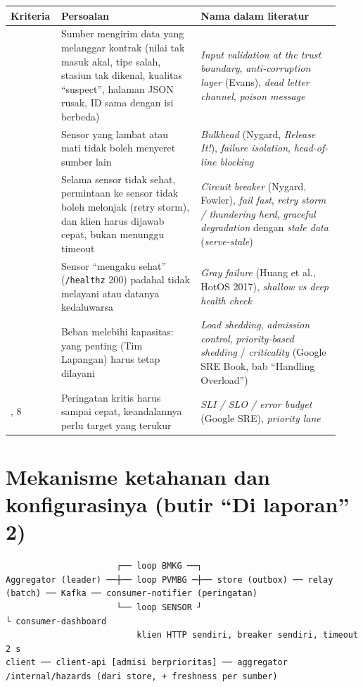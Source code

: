 {\small
\begin{longtable}{@{}>{\raggedright\arraybackslash}p{0.112\linewidth}>{\raggedright\arraybackslash}p{0.411\linewidth}>{\raggedright\arraybackslash}p{0.411\linewidth}@{}}
\toprule
\textbf{Kriteria} & \textbf{Persoalan} & \textbf{Nama dalam literatur} \\
\midrule
\endhead
2 & Sumber mengirim data yang melanggar kontrak (nilai tak masuk akal, tipe salah, stasiun tak dikenal, kualitas ``suspect'', halaman JSON rusak, ID sama dengan isi berbeda) & \emph{Input validation at the trust boundary}, \emph{anti-corruption layer} (Evans), \emph{dead letter channel}, \emph{poison message} \\
3 & Sensor yang lambat atau mati tidak boleh menyeret sumber lain & \emph{Bulkhead} (Nygard, \emph{Release It!}), \emph{failure isolation}, \emph{head-of-line blocking} \\
4 & Selama sensor tidak sehat, permintaan ke sensor tidak boleh melonjak (retry storm), dan klien harus dijawab cepat, bukan menunggu timeout & \emph{Circuit breaker} (Nygard, Fowler), \emph{fail fast}, \emph{retry storm / thundering herd}, \emph{graceful degradation} dengan \emph{stale data} (\emph{serve-stale}) \\
4 & Sensor ``mengaku sehat'' (\texttt{/\allowbreak{}healthz} 200) padahal tidak melayani atau datanya kedaluwarsa & \emph{Gray failure} (Huang et al., HotOS 2017), \emph{shallow vs deep health check} \\
5 & Beban melebihi kapasitas: yang penting (Tim Lapangan) harus tetap dilayani & \emph{Load shedding}, \emph{admission control}, \emph{priority-based shedding} / \emph{criticality} (Google SRE Book, bab ``Handling Overload'') \\
1, 8 & Peringatan kritis harus sampai cepat, keandalannya perlu target yang terukur & \emph{SLI / SLO / error budget} (Google SRE), \emph{priority lane} \\
\bottomrule
\end{longtable}
}

\section{Mekanisme ketahanan dan konfigurasinya (butir ``Di laporan'' 2)}

\begin{lstlisting}
                      ┌── loop BMKG ──┐
Aggregator (leader) ──┼── loop PVMBG ─┼── store (outbox) ── relay (batch) ── Kafka ── consumer-notifier (peringatan)
                      └── loop SENSOR ┘                                             └ consumer-dashboard
                          klien HTTP sendiri, breaker sendiri, timeout 2 s
client ── client-api [admisi berprioritas] ── aggregator /internal/hazards (dari store, + freshness per sumber)
\end{lstlisting}

